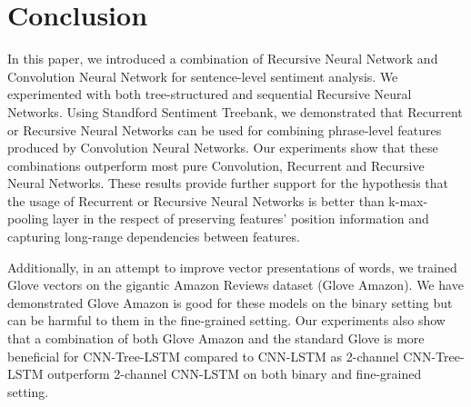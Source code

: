 \section{Conclusion}
In this paper, we introduced a combination of Recursive Neural Network and Convolution Neural Network for sentence-level sentiment analysis.
We experimented with both tree-structured and sequential Recursive Neural Networks.
Using Standford Sentiment Treebank, we demonstrated that Recurrent or Recursive Neural Networks can be used for combining phrase-level features produced by Convolution Neural Networks.
Our experiments show that these combinations outperform most pure Convolution, Recurrent and Recursive Neural Networks. 
These results provide further support for the hypothesis that the usage of Recurrent or Recursive Neural Networks is better than k-max-pooling layer in the respect of preserving features' position information and capturing long-range dependencies between features. 

Additionally, in an attempt to improve vector presentations of words, we trained Glove vectors on the gigantic Amazon Reviews dataset (Glove Amazon).
We have demonstrated Glove Amazon is good for these models on the binary setting but can be harmful to them in the fine-grained setting.
Our experiments also show that a combination of both Glove Amazon and the standard Glove is more beneficial for CNN-Tree-LSTM compared to CNN-LSTM as 2-channel CNN-Tree-LSTM outperform 2-channel CNN-LSTM on both binary and fine-grained setting.


